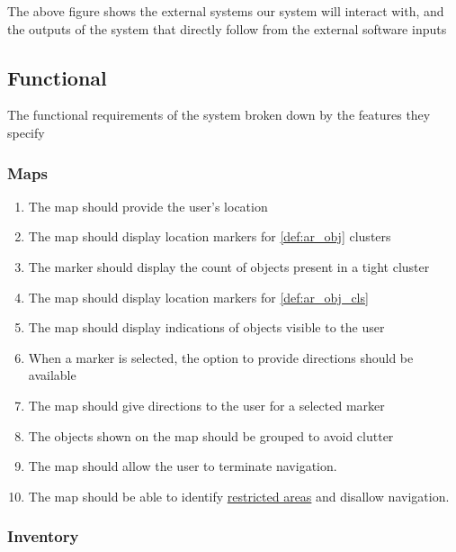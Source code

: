 \documentclass{article}
\begin{document}
The above figure shows the external systems our system will interact with, and the outputs of the system that directly follow from the external software inputs

\subsection{Functional}
\label{sub:functional}

The functional requirements of the system broken down by the features they specify

\subsubsection{Maps}
\label{ssub:maps}

\begin{enumerate}[align=left, label=\textbf{MP-FR\arabic*:}]
    \item The map should provide the user's location
    \item The map should display location markers for \ref{def:ar_obj} clusters
    \item The marker should display the count of objects present in a tight cluster
    \item The map should display location markers for \ref{def:ar_obj_cls}
    \item The map should display indications of objects visible to the user
    \item When a marker is selected, the option to provide directions should be available
    \item The map should give directions to the user for a selected marker
    \item The objects shown on the map should be grouped to avoid clutter
    \item The map should allow the user to terminate navigation. \\
    \item The map should be able to identify \hyperref[def:restricted_area]{restricted areas} and disallow navigation.\\
\end{enumerate}

\subsubsection{Inventory}
\label{ssub:inventory}
\end{document}

